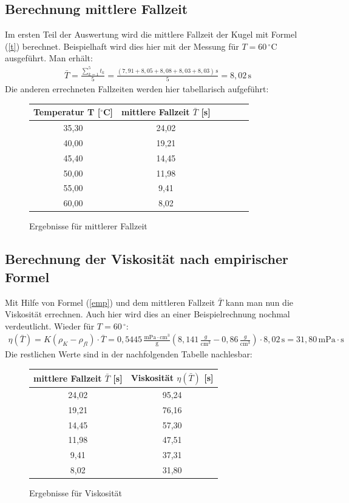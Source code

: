 \documentclass[fontsize=12pt]{scrartcl}
\begin{document}
\subsection{Berechnung mittlere Fallzeit}

Im ersten Teil der Auswertung wird die mittlere Fallzeit der Kugel mit Formel (\ref{t}) berechnet. Beispielhaft wird dies hier mit der Messung für $T=60\,^{\circ}$C ausgeführt. Man erhält:
\begin{align*}
\bar{T}= \frac{\sum_{k=1}^5 t_k}{5} =  \frac{(7,91+8,05	+8,08	+8,03+	8,03)\,\text{s}}{5}=8,02\,\text{s}
\end{align*}
Die anderen errechneten Fallzeiten werden hier tabellarisch aufgeführt:
\begin{figure}[H]
 \vspace{-12pt}
\centering
\caption{Ergebnisse für mittlerer Fallzeit}
\begin{tabular}{|c|c|c|c|c|c|} \hline
\rule{0pt}{12pt} Temperatur T [$^{\circ}$C]	&mittlere Fallzeit $ \bar{T}$ [s] \\ \hline
35,30	&24,02\\ \hline
40,00	&19,21\\ \hline
45,40	&14,45\\ \hline
50,00	&11,98\\ \hline
55,00	&9,41\\ \hline
60,00	&8,02\\ \hline
\end{tabular}				
\end{figure}

\subsection{Berechnung der Viskosität nach empirischer Formel}

Mit Hilfe von Formel (\ref{emp}) und dem mittleren Fallzeit $\bar{T}$ kann man nun die Viskosität errechnen. Auch hier wird dies an einer Beispielrechnung nochmal verdeutlicht. Wieder für $T=60\,^{\circ}$:
\begin{align*}
\eta(\bar{T})=K(\rho_K-\rho_{fl})\cdot\bar{T}=0,5445\,\frac{\text{mPa}\cdot\text{cm}^3}{\text{g}}(8,141\,\frac{g}{\text{cm}^3}- 0,86\,\frac{g}{\text{cm}^3})\cdot8,02\,\text{s}=31,80\,\text{mPa}\cdot\text{s}
\end{align*}
Die restlichen Werte sind in der nachfolgenden Tabelle nachlesbar:
\begin{figure}[H]
 \vspace{-12pt}
\centering
\caption{Ergebnisse für Viskosität}
\label{tab}
\begin{tabular}{|c|c|} \hline
\rule{0pt}{12pt} mittlere Fallzeit $ \bar{T}$ [s] &Viskosität $\eta(\bar{T})$ [s] \\ \hline
24,02	&95,24 \\ \hline
19,21	&76,16 \\ \hline
14,45	&57,30 \\ \hline
11,98	&47,51 \\ \hline
9,41		&37,31 \\ \hline
8,02		&31,80 \\ \hline
\end{tabular}				
\end{figure}
\newpage
\end{document}
